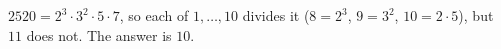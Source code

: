 $2520=2^3\cdot3^2\cdot5\cdot7$, so each of $1,\dots,10$ divides it ($8=2^3$, $9=3^2$, $10=2\cdot5$), but $11$ does not. The answer is $\boxed{10}$.
